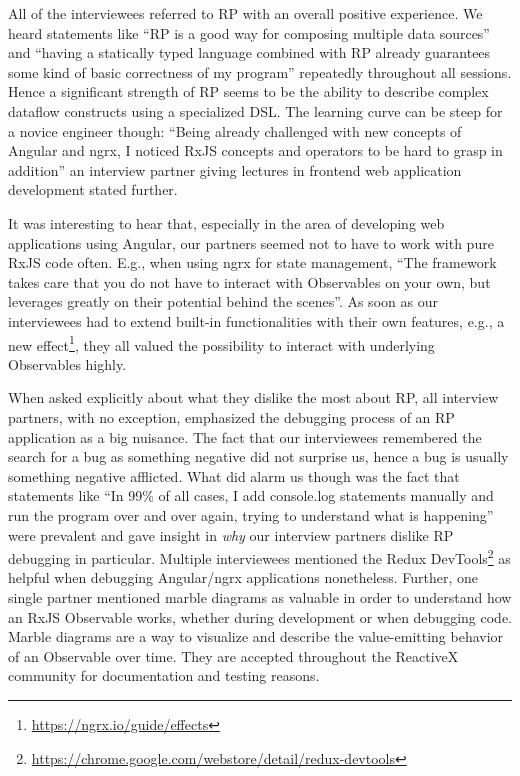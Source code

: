 \documentclass[12pt,a4paper]{article}
\begin{document}
All of the interviewees referred to RP with an overall positive experience. We heard statements like ``RP is a good way for composing multiple data sources'' and ``having a statically typed language combined with RP already guarantees some kind of basic correctness of my program'' repeatedly throughout all sessions. Hence a significant strength of RP seems to be the ability to describe complex dataflow constructs using a specialized DSL. The learning curve can be steep for a novice engineer though: ``Being already challenged with new concepts of Angular and ngrx, I noticed RxJS concepts and operators to be hard to grasp in addition'' an interview partner giving lectures in frontend web application development stated further.

It was interesting to hear that, especially in the area of developing web applications using Angular, our partners seemed not to have to work with pure RxJS code often. E.g., when using ngrx for state management, ``The framework takes care that you do not have to interact with Observables on your own, but leverages greatly on their potential behind the scenes''. As soon as our interviewees had to extend built-in functionalities with their own features, e.g., a new effect\footnote{\url{https://ngrx.io/guide/effects}}, they all valued the possibility to interact with underlying Observables highly.

When asked explicitly about what they dislike the most about RP, all interview partners, with no exception, emphasized the debugging process of an RP application as a big nuisance. The fact that our interviewees remembered the search for a bug as something negative did not surprise us, hence a bug is usually something negative afflicted. What did alarm us though was the fact that statements like ``In 99\% of all cases, I add console.log statements manually and run the program over and over again, trying to understand what is happening'' were prevalent and gave insight in \emph{why} our interview partners dislike RP debugging in particular. Multiple interviewees mentioned the Redux DevTools\footnote{\url{https://chrome.google.com/webstore/detail/redux-devtools}} as helpful when debugging Angular/ngrx applications nonetheless. Further, one single partner mentioned marble diagrams as valuable in order to understand how an RxJS Observable works, whether during development or when debugging code. Marble diagrams are a way to visualize and describe the value-emitting behavior of an Observable over time. They are accepted throughout the ReactiveX community for documentation\cite{marblediagrams} and testing reasons\cite{marbletesting}.
\end{document}
